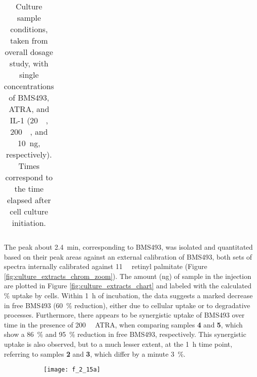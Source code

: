 \begin{refsection}
\begin{table}[h!]
\begin{tabular}{ ccccc }
  \hline
\end{tabular}
\caption[Culture sample conditions]{Culture sample conditions, taken from
overall dosage study, with single concentrations of BMS493, ATRA, and IL-1
(\SI{20}{\micro\moLar}, \SI{200}{\nano\moLar}, and \SI{10}{\ng},
respectively). Times correspond to the time elapsed after cell culture
initiation.}
\label{tab:culture_extracts_table}
\end{table}
The peak about \SI{2.4}{\minute}, corresponding to BMS493, was isolated and
quantitated based on their peak areas against an external calibration of BMS493,
both sets of spectra internally calibrated against \SI{11}{\micro\moLar} retinyl
palmitate (Figure \ref{fig:culture_extracts_chrom_zoom}). The amount (\si{\ng})
of sample in the injection are plotted in Figure
\ref{fig:culture_extracts_chart} and labeled with the calculated \% uptake by
cells. Within \SI{1}{\hour} of incubation, the data suggests a marked decrease
in free BMS493 (\SI{60}{\percent} reduction), either due to cellular uptake or to degradative processes.
Furthermore, there appears to be synergistic uptake of BMS493 over time in the
presence of \SI{200}{\nano\moLar} ATRA, when comparing samples \textbf{4} and
\textbf{5}, which show a \SI{86}{\percent} and \SI{95}{\percent} reduction in
free BMS493, respectively. This synergistic uptake is also observed, but to a much lesser
extent, at the \SI{1}{\hour} time point, referring to samples \textbf{2} and
\textbf{3}, which differ by a minute \SI{3}{\percent}.
\begin{figure}[h!]
    \centering
    \begin{subfigure}[b]{0.8\textwidth}
        \texttt{[image: f\_2\_15a]}
        \caption{}
        \label{fig:culture_extracts_chrom}
    \end{subfigure}


\end{figure}
\end{refsection}
